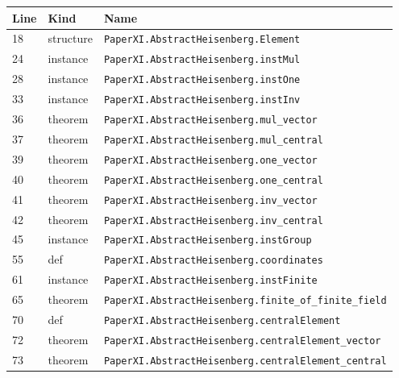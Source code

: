 \documentclass[10pt,oneside]{book}
\begin{document}
\begin{longtable}{@{}p{}p{}p{}@{}}\toprule Line&Kind&Name\\\midrule\endhead

18&structure&\nolinkurl{PaperXI.AbstractHeisenberg.Element}\\

24&instance&\nolinkurl{PaperXI.AbstractHeisenberg.instMul}\\

28&instance&\nolinkurl{PaperXI.AbstractHeisenberg.instOne}\\

33&instance&\nolinkurl{PaperXI.AbstractHeisenberg.instInv}\\

36&theorem&\nolinkurl{PaperXI.AbstractHeisenberg.mul_vector}\\

37&theorem&\nolinkurl{PaperXI.AbstractHeisenberg.mul_central}\\

39&theorem&\nolinkurl{PaperXI.AbstractHeisenberg.one_vector}\\

40&theorem&\nolinkurl{PaperXI.AbstractHeisenberg.one_central}\\

41&theorem&\nolinkurl{PaperXI.AbstractHeisenberg.inv_vector}\\

42&theorem&\nolinkurl{PaperXI.AbstractHeisenberg.inv_central}\\

45&instance&\nolinkurl{PaperXI.AbstractHeisenberg.instGroup}\\

55&def&\nolinkurl{PaperXI.AbstractHeisenberg.coordinates}\\

61&instance&\nolinkurl{PaperXI.AbstractHeisenberg.instFinite}\\

65&theorem&\nolinkurl{PaperXI.AbstractHeisenberg.finite_of_finite_field}\\

70&def&\nolinkurl{PaperXI.AbstractHeisenberg.centralElement}\\

72&theorem&\nolinkurl{PaperXI.AbstractHeisenberg.centralElement_vector}\\

73&theorem&\nolinkurl{PaperXI.AbstractHeisenberg.centralElement_central}\\


\end{longtable}
\end{document}
